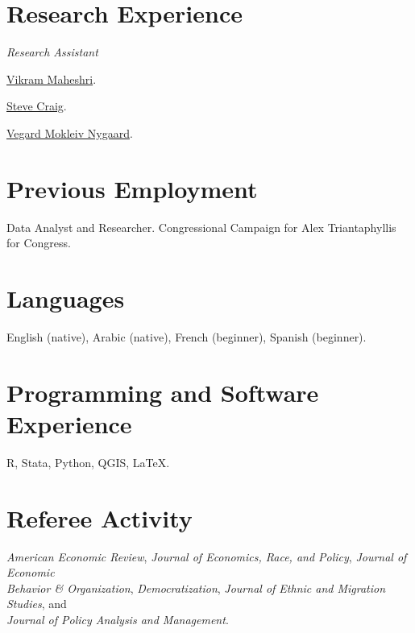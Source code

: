 \documentclass[letterpaper]{article}
\renewenvironment{itemize}{
  \begin{list}{}{
    \setlength{\leftmargin}{1.5em}
  }
}{
  \end{list}
}
\begin{document}
\section*{Research Experience}
\vspace{2 mm}
\textit{Research Assistant}
\begin{itemize}
\item {}\href{https://vmaheshri.github.io/}{Vikram Maheshri}.
\item {}\href{https://www.uh.edu/class/economics/people/current-faculty/steve/}{Steve Craig}.
\item {}\href{https://sites.google.com/site/vegardmokleivnygaard/}{Vegard Mokleiv Nygaard}.
\end{itemize}
\vspace{2 mm}

\section*{Previous Employment}
\vspace{2 mm}
\begin{itemize}
\item {}Data Analyst and Researcher. Congressional Campaign for Alex Triantaphyllis for Congress.
\end{itemize}
\vspace{2 mm}

\section*{Languages}
\vspace{2 mm}
{\makebox[2.3cm]{\hfill}}English (native), Arabic (native), French (beginner), Spanish (beginner).
\vspace{2 mm}


\section*{Programming and Software Experience}
\vspace{2 mm}
{\makebox[2.3cm]{\hfill}}R, Stata, Python, QGIS, \LaTeX.
\vspace{2 mm}

\section*{Referee Activity}
\vspace{2 mm}
{\makebox[2.3cm]{\hfill}}\textit{American Economic Review}, \textit{Journal of Economics, Race, and Policy}, \textit{Journal of Economic \\ {\makebox[2.3cm]{\hfill}}Behavior \& Organization}, \textit{Democratization}, \textit{Journal of Ethnic and Migration Studies}, and \\ {\makebox[2.3cm]{\hfill}}\textit{Journal of Policy Analysis and Management}.
\vspace{2 mm}
\end{document}
